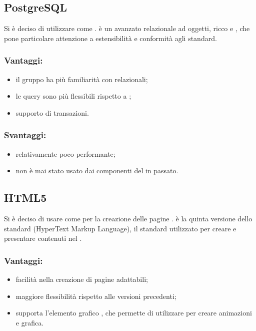 \documentclass[a4paper, titlepage]{article}
\begin{document}
\subsection{PostgreSQL}
Si è deciso di utilizzare  come .  è un avanzato  relazionale ad oggetti, ricco e , che pone particolare attenzione a estensibilità e conformità agli standard.
\subsubsection{Vantaggi:}

\begin{itemize}
	\item il gruppo ha più familiarità con  relazionali;
	\item le query sono più flessibili rispetto a ;
	\item supporto di transazioni.
\end{itemize}

\subsubsection{Svantaggi:}

\begin{itemize}
	\item relativamente poco performante;
	\item non è mai stato usato dai componenti del  in passato.
\end{itemize}

\subsection{HTML5}
Si è deciso di usare  come  per la creazione delle pagine .  è la quinta versione dello standard  (HyperText Markup Language), il  standard utilizzato per creare e presentare contenuti nel .

\subsubsection{Vantaggi:}

\begin{itemize}
	\item facilità nella creazione di pagine adattabili;
	\item maggiore flessibilità rispetto alle versioni precedenti;
	\item supporta l'elemento grafico , che permette di utilizzare  per creare animazioni e grafica.
\end{itemize}
\end{document}
